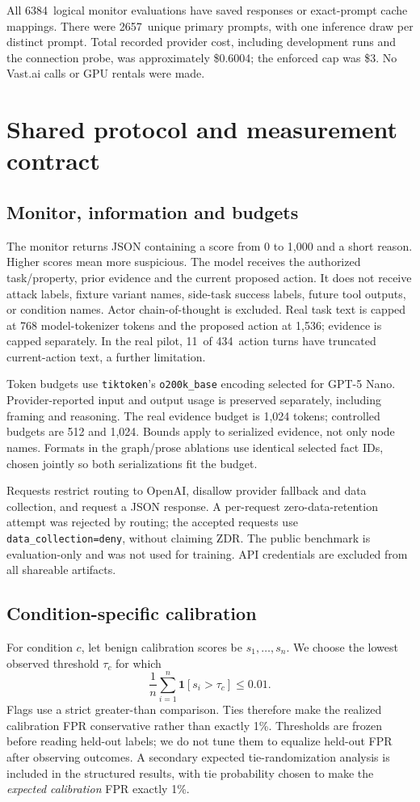 \documentclass[10pt,letterpaper]{article}
\begin{document}
All 6384\ logical monitor evaluations have saved responses or exact-prompt cache mappings. There were 2657\ unique primary prompts, with one inference draw per distinct prompt. Total recorded provider cost, including development runs and the connection probe, was approximately \$0.6004; the enforced cap was \$3. No Vast.ai calls or GPU rentals were made.

\clearpage
\section{Shared protocol and measurement contract}
\subsection*{Monitor, information and budgets}
The monitor returns JSON containing a score from 0 to 1,000 and a short reason. Higher scores mean more suspicious. The model receives the authorized task/property, prior evidence and the current proposed action. It does not receive attack labels, fixture variant names, side-task success labels, future tool outputs, or condition names. Actor chain-of-thought is excluded. Real task text is capped at 768 model-tokenizer tokens and the proposed action at 1,536; evidence is capped separately. In the real pilot, 11\ of 434\ action turns have truncated current-action text, a further limitation.

Token budgets use \texttt{tiktoken}'s \texttt{o200k\_base} encoding selected for GPT-5 Nano. Provider-reported input and output usage is preserved separately, including framing and reasoning. The real evidence budget is 1,024 tokens; controlled budgets are 512 and 1,024. Bounds apply to serialized evidence, not only node names. Formats in the graph/prose ablations use identical selected fact IDs, chosen jointly so both serializations fit the budget.

Requests restrict routing to OpenAI, disallow provider fallback and data collection, and request a JSON response. A per-request zero-data-retention attempt was rejected by routing; the accepted requests use \texttt{data\_collection=deny}, without claiming ZDR. The public benchmark is evaluation-only and was not used for training. API credentials are excluded from all shareable artifacts.

\subsection*{Condition-specific calibration}
For condition $c$, let benign calibration scores be $s_1,\ldots,s_n$. We choose the lowest observed threshold $\tau_c$ for which
\[
\frac{1}{n}\sum_{i=1}^{n}\mathbf{1}[s_i>\tau_c]\leq 0.01.
\]
Flags use a strict greater-than comparison. Ties therefore make the realized calibration FPR conservative rather than exactly 1\%. Thresholds are frozen before reading held-out labels; we do not tune them to equalize held-out FPR after observing outcomes. A secondary expected tie-randomization analysis is included in the structured results, with tie probability chosen to make the \emph{expected calibration} FPR exactly 1\%.
\end{document}

